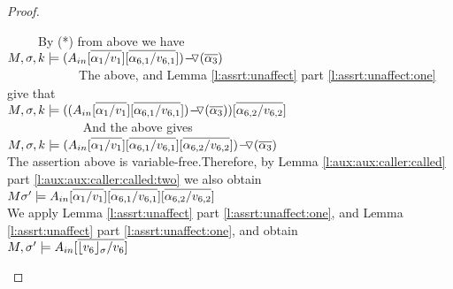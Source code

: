 \begin{proof}
\begin{enumerate}[a.]
      \ \ \ \ \ By (*) from above we have\\
$\satDAssertFrom M  \sigma k  { \PushASLong  {(\overline {\alpha_3})}  {( \Ain[\overline  {\alpha_1 /v_1}]  [\overline { \alpha_{6,1}/v_{6,1}}] )}}$
 \\
$\strut \hspace{2cm}  $The above, and   Lemma \ref{l:assrt:unaffect} part \ref{l:assrt:unaffect:one}  give that\\
 $\satDAssertFrom M  \sigma k  {({ \PushASLong  {(\overline {\alpha_3})}  {( \Ain[\overline  {\alpha_1 /v_1} ] [\overline { \alpha_{6,1}/v_{6,1}}] )}}
 ) [\overline  {\alpha_{6,2} /v_{6,2}} ] }$
  \\
$\strut \hspace{2cm}  $ And the above gives\\
 $\satDAssertFrom M  \sigma k  { \PushASLong  {(\overline {\alpha_3})}  {( \Ain[\overline  {\alpha_1 /v_1} ] [\overline { \alpha_{6,1}/v_{6,1}}]  [\overline  {\alpha_{6,2} /v_{6,2}} ] ) }} $
  \\
The assertion above is variable-free.Therefore,  by Lemma \ref{l:aux:aux:caller:called} part \ref{l:aux:aux:caller:called:two} we also obtain\\ 
$ M  \sigma' \models  {   {  \Ain[\overline  {\alpha_1 /v_1} ] [\overline { \alpha_{6,1}/v_{6,1}}]  [\overline  {\alpha_{6,2} /v_{6,2}} ] }} $  
  \\
We apply Lemma  \ref{l:assrt:unaffect} part \ref{l:assrt:unaffect:one}, and  Lemma \ref{l:assrt:unaffect} part \ref{l:assrt:unaffect:one}, and obtain \\
$ M,   {\sigma'}  \models  { \Ain   [\overline {  \interpret {\sigma} {v_6}/v_6 }]}$  
  
  
\end{enumerate}


\end{proof}

